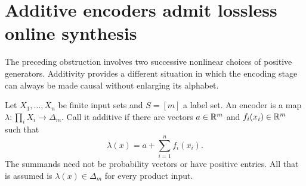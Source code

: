 \section{Additive encoders admit lossless online synthesis}
\label{sec:additive}
The preceding obstruction involves two successive nonlinear choices of
positive generators. Additivity provides a different situation in which
the encoding stage can always be made causal without enlarging its
alphabet.

Let $X_1,\ldots,X_n$ be finite input sets and $S=[m]$ a label set. An
encoder is a map $\lambda:\prod_iX_i\to\Delta_m$. Call it additive if
there are vectors $a\in\mathbb R^m$ and $f_i(x_i)\in\mathbb R^m$ such that
\begin{equation}\label{eq:additive-encoder}
               \lambda(x)=a+\sum_{i=1}^nf_i(x_i).
\end{equation}
The summands need not be probability vectors or have positive entries.
All that is assumed is $\lambda(x)\in\Delta_m$ for every product input.

